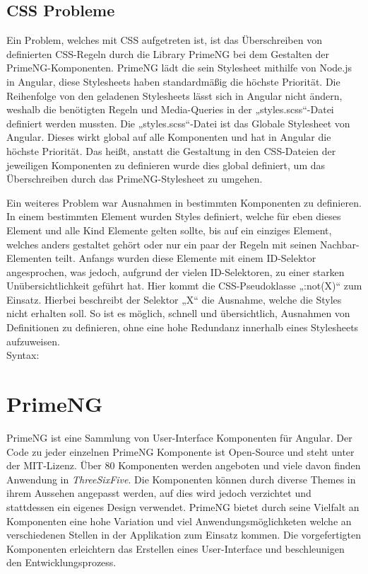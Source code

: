 \subsection{CSS Probleme}
Ein Problem, welches mit CSS aufgetreten ist, ist das Überschreiben von definierten CSS-Regeln durch die Library PrimeNG bei dem Gestalten der PrimeNG-Komponenten. PrimeNG lädt die sein Stylesheet mithilfe von Node.js in Angular, diese Stylesheets haben standardmäßig die höchste Priorität. Die Reihenfolge von den geladenen Stylesheets lässt sich in Angular nicht ändern, weshalb die benötigten Regeln und Media-Queries in der „styles.scss“-Datei definiert werden mussten. Die „styles.scss“-Datei ist das Globale Stylesheet von Angular. Dieses wirkt global auf alle Komponenten und hat in Angular die höchste Priorität. Das heißt, anstatt die Gestaltung in den CSS-Dateien der jeweiligen Komponenten zu definieren wurde dies global definiert, um das Überschreiben durch das PrimeNG-Stylesheet zu umgehen.

Ein weiteres Problem war Ausnahmen in bestimmten Komponenten zu definieren. In einem bestimmten Element wurden Styles definiert, welche für eben dieses Element und alle Kind Elemente gelten sollte, bis auf ein einziges Element, welches anders gestaltet gehört oder nur ein paar der Regeln mit seinen Nachbar-Elementen teilt. Anfangs wurden diese Elemente mit einem ID-Selektor angesprochen, was jedoch, aufgrund der vielen ID-Selektoren, zu einer starken Unübersichtlichkeit geführt hat. Hier kommt die CSS-Pseudoklasse „:not(X)“\cite{notcss} zum Einsatz. Hierbei beschreibt der Selektor „X“ die Ausnahme, welche die Styles nicht erhalten soll. So ist es möglich, schnell und übersichtlich, Ausnahmen von Definitionen zu definieren, ohne eine hohe Redundanz innerhalb eines Stylesheets aufzuweisen.
\\

Syntax: 

\section{PrimeNG}
PrimeNG ist eine Sammlung von User-Interface Komponenten für Angular. Der Code zu jeder einzelnen PrimeNG Komponente ist Open-Source und steht unter der MIT-Lizenz. Über 80 Komponenten werden angeboten und viele davon finden Anwendung in \textit{ThreeSixFive}. Die Komponenten können durch diverse Themes in ihrem Aussehen angepasst werden, auf dies wird jedoch verzichtet und stattdessen ein eigenes Design verwendet. PrimeNG bietet durch seine Vielfalt an Komponenten eine hohe Variation und viel Anwendungsmöglichketen welche an verschiedenen Stellen in der Applikation zum Einsatz kommen. Die vorgefertigten Komponenten erleichtern das Erstellen eines User-Interface und beschleunigen den Entwicklungsprozess.

